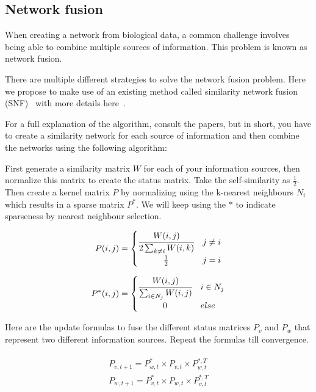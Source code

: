 \documentclass{article}
\begin{document}
\subsection{Network fusion}

When creating a network from biological data, a common challenge involves
being able to combine multiple sources of information. This problem is
known as network fusion. 

There are multiple different strategies to solve the network fusion problem. 
Here we propose to make use of an existing method called 
similarity network fusion (SNF)~\cite{wang2014similarity}
with more details here~\cite{wang2012unsupervised}.

For a full explanation of the algorithm,
consult the papers, but in short, you have to create a similarity network
for each source of information and then combine the networks using the 
following algorithm:

First generate a similarity matrix $W$ for each of your information sources, 
then normalize this matrix to create the status matrix.
Take the self-similarity as $\frac{1}{2}$.
Then create a kernel matrix $P$ 
by normalizing using the k-nearest neighbours $N_i$ which 
results in a sparse matrix $P^*$. We will keep using the $*$ to indicate sparseness
by nearest neighbour selection.

\begin{equation}
    P(i, j) = 
    \begin{cases}
        \cfrac{W(i, j)}{2 \sum_{k \neq i}W(i, k)} & j \neq i \\
        \hfil \frac{1}{2} & j = i
    \end{cases}
\end{equation}

\begin{equation} \label{eq:normsparse}
    P^*(i, j) = 
    \begin{cases}
        \cfrac{W(i, j)}{\sum_{i \in N_j}W(i, j)} & i \in N_j \\
        \hfil 0 & else
    \end{cases}
\end{equation} 

Here are the update formulas to fuse the different status matrices $P_v$ and $P_w$ that 
represent two different information sources. Repeat the formulas till convergence.

\begin{align} \label{eq:update}
    \begin{split}
        P_{v, t+1} = P^*_{w, t} \times P_{v, t} \times P^{*,T}_{w, t} \\
        P_{w, t+1} = P^*_{v, t} \times P_{w, t} \times P^{*,T}_{v, t}
    \end{split}
\end{align}
\end{document}
